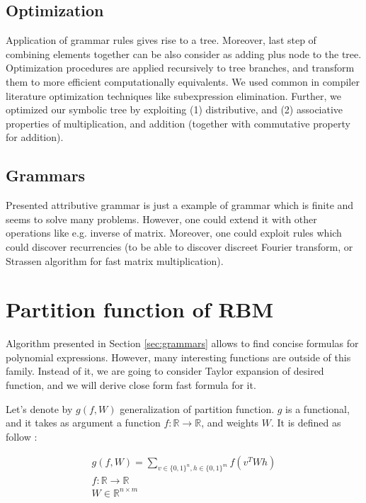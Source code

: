 \documentclass{article}
\begin{document}
\subsection{Optimization}

Application of grammar rules gives rise to a tree. Moreover, last step of
combining elements together can be also consider as adding plus node to the
tree. Optimization procedures are applied recursively to tree branches, and
transform them to more efficient computationally equivalents. We used common in
compiler literature optimization techniques like subexpression elimination.
Further, we optimized our symbolic tree by exploiting (1) distributive, and (2)
associative properties of multiplication, and addition (together with
commutative property for addition).

\subsection{Grammars}
Presented attributive grammar is just a example of grammar which is finite
and seems to solve many problems. However, one could extend it with 
other operations like e.g. inverse of matrix. Moreover, one could exploit
rules which could discover recurrencies (to be able to discover discreet Fourier transform, or
Strassen algorithm for fast matrix multiplication).

\section{Partition function of RBM} \label{partitionfunction}
Algorithm presented in Section
\ref{sec:grammars} allows to find concise formulas for polynomial expressions.
However, many interesting functions are outside of this family.  Instead of it,
we are going to consider Taylor expansion of desired function, and we will
derive close form fast formula for it.

Let's denote by $g(f, W)$ generalization of partition function. 
$g$ is a functional, and it takes as argument a function $f : \mathbb{R} \rightarrow \mathbb{R}$,
and weights $W$. It is defined as follow : 

\begin{gather*}
g(f, W) = \sum_{v \in \{0, 1\}^n, h \in \{0, 1\}^m} f(v^TWh) \\
f : \mathbb{R} \rightarrow \mathbb{R}\\
W \in \mathbb{R}^{n \times m}
\end{gather*}
\end{document}
